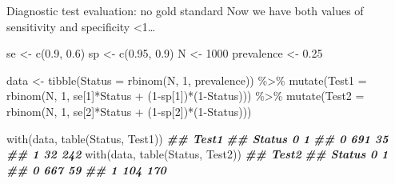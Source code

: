 \documentclass[
  ignorenonframetext,
  aspectratio=169,
]{beamer}
\newenvironment{Shaded}{\begin{snugshade}}{\end{snugshade}}
\newcommand{\AttributeTok}[1]{\textcolor[rgb]{0.77,0.63,0.00}{#1}}
\newcommand{\DecValTok}[1]{\textcolor[rgb]{0.00,0.00,0.81}{#1}}
\newcommand{\DocumentationTok}[1]{\textcolor[rgb]{0.56,0.35,0.01}{\textbf{\textit{#1}}}}
\newcommand{\FloatTok}[1]{\textcolor[rgb]{0.00,0.00,0.81}{#1}}
\newcommand{\FunctionTok}[1]{\textcolor[rgb]{0.00,0.00,0.00}{#1}}
\newcommand{\NormalTok}[1]{#1}
\newcommand{\OtherTok}[1]{\textcolor[rgb]{0.56,0.35,0.01}{#1}}
\newcommand{\SpecialCharTok}[1]{\textcolor[rgb]{0.00,0.00,0.00}{#1}}
\begin{document}
\begin{frame}[fragile]{Diagnostic test evaluation: no gold standard}
\protect\hypertarget{diagnostic-test-evaluation-no-gold-standard}{}
Now we have both values of sensitivity and specificity
\textless1\ldots{}

\scriptsize

\begin{Shaded}
\begin{Highlighting}[]
\NormalTok{se }\OtherTok{\textless{}{-}} \FunctionTok{c}\NormalTok{(}\FloatTok{0.9}\NormalTok{, }\FloatTok{0.6}\NormalTok{)}
\NormalTok{sp }\OtherTok{\textless{}{-}} \FunctionTok{c}\NormalTok{(}\FloatTok{0.95}\NormalTok{, }\FloatTok{0.9}\NormalTok{)}
\NormalTok{N }\OtherTok{\textless{}{-}} \DecValTok{1000}
\NormalTok{prevalence }\OtherTok{\textless{}{-}} \FloatTok{0.25}

\NormalTok{data }\OtherTok{\textless{}{-}} \FunctionTok{tibble}\NormalTok{(}\AttributeTok{Status =} \FunctionTok{rbinom}\NormalTok{(N, }\DecValTok{1}\NormalTok{, prevalence)) }\SpecialCharTok{\%\textgreater{}\%}
  \FunctionTok{mutate}\NormalTok{(}\AttributeTok{Test1 =} \FunctionTok{rbinom}\NormalTok{(N, }\DecValTok{1}\NormalTok{, se[}\DecValTok{1}\NormalTok{]}\SpecialCharTok{*}\NormalTok{Status }\SpecialCharTok{+}\NormalTok{ (}\DecValTok{1}\SpecialCharTok{{-}}\NormalTok{sp[}\DecValTok{1}\NormalTok{])}\SpecialCharTok{*}\NormalTok{(}\DecValTok{1}\SpecialCharTok{{-}}\NormalTok{Status))) }\SpecialCharTok{\%\textgreater{}\%}
  \FunctionTok{mutate}\NormalTok{(}\AttributeTok{Test2 =} \FunctionTok{rbinom}\NormalTok{(N, }\DecValTok{1}\NormalTok{, se[}\DecValTok{2}\NormalTok{]}\SpecialCharTok{*}\NormalTok{Status }\SpecialCharTok{+}\NormalTok{ (}\DecValTok{1}\SpecialCharTok{{-}}\NormalTok{sp[}\DecValTok{2}\NormalTok{])}\SpecialCharTok{*}\NormalTok{(}\DecValTok{1}\SpecialCharTok{{-}}\NormalTok{Status)))}

\FunctionTok{with}\NormalTok{(data, }\FunctionTok{table}\NormalTok{(Status, Test1))}
\DocumentationTok{\#\#       Test1}
\DocumentationTok{\#\# Status   0   1}
\DocumentationTok{\#\#      0 691  35}
\DocumentationTok{\#\#      1  32 242}
\FunctionTok{with}\NormalTok{(data, }\FunctionTok{table}\NormalTok{(Status, Test2))}
\DocumentationTok{\#\#       Test2}
\DocumentationTok{\#\# Status   0   1}
\DocumentationTok{\#\#      0 667  59}
\DocumentationTok{\#\#      1 104 170}
\end{Highlighting}
\end{Shaded}

\normalsize
\end{frame}
\end{document}
